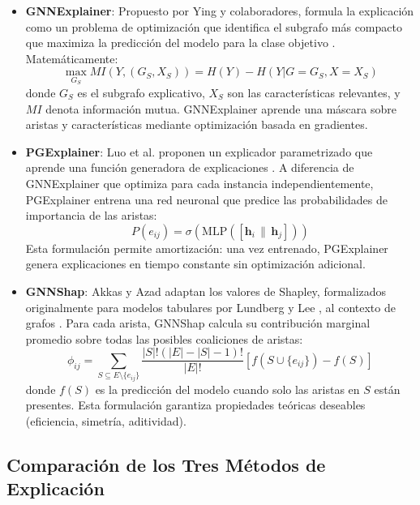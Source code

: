 \begin{itemize}
    \item \textbf{GNNExplainer}: Propuesto por Ying y colaboradores, formula la explicación como un problema de optimización que identifica el subgrafo más compacto que maximiza la predicción del modelo para la clase objetivo \cite{Ying2019Gnnexplainer:Networks}. Matemáticamente:
    \[ \max_{G_S} MI(Y, (G_S, X_S)) = H(Y) - H(Y | G = G_S, X = X_S) \]
    donde $G_S$ es el subgrafo explicativo, $X_S$ son las características relevantes, y $MI$ denota información mutua. GNNExplainer aprende una máscara sobre aristas y características mediante optimización basada en gradientes.
    
    \item \textbf{PGExplainer}: Luo et al. proponen un explicador parametrizado que aprende una función generadora de explicaciones \cite{Luo2020ParameterizedNetwork}. A diferencia de GNNExplainer que optimiza para cada instancia independientemente, PGExplainer entrena una red neuronal que predice las probabilidades de importancia de las aristas:
    \[ P(e_{ij}) = \sigma(\text{MLP}([\mathbf{h}_i \, \| \, \mathbf{h}_j])) \]
    Esta formulación permite amortización: una vez entrenado, PGExplainer genera explicaciones en tiempo constante sin optimización adicional.
    
    \item \textbf{GNNShap}: Akkas y Azad adaptan los valores de Shapley, formalizados originalmente para modelos tabulares por Lundberg y Lee \cite{Lundberg2017AProach}, al contexto de grafos \cite{Akkas2024Gnnshap:Values}. Para cada arista, GNNShap calcula su contribución marginal promedio sobre todas las posibles coaliciones de aristas:
    \[ \phi_{ij} = \sum_{S \subseteq E \setminus \{e_{ij}\}} \frac{|S|!(|E|-|S|-1)!}{|E|!} [f(S \cup \{e_{ij}\}) - f(S)] \]
    donde $f(S)$ es la predicción del modelo cuando solo las aristas en $S$ están presentes. Esta formulación garantiza propiedades teóricas deseables (eficiencia, simetría, aditividad).
\end{itemize}

\subsection{Comparación de los Tres Métodos de Explicación}

